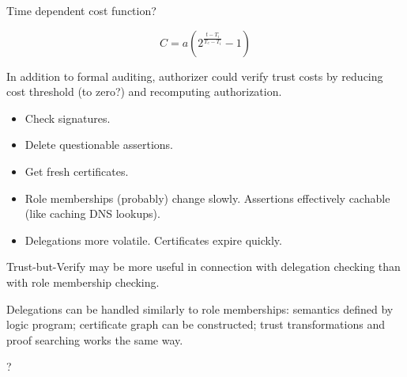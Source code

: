 \documentclass[landscape]{slides}
\begin{document}
Time dependent cost function?

\begin{displaymath}
C = a \left( 2^{\frac{t - T_i}{T_e - T_i}} - 1 \right)
\end{displaymath}
\stopslide

In addition to formal auditing, authorizer could verify trust costs by reducing cost threshold (to zero?) and recomputing authorization.
\begin{itemize}
\item Check signatures.
\item Delete questionable assertions.
\item Get fresh certificates.
\end{itemize}
\stopslide

\begin{itemize}
\item Role memberships (probably) change slowly. Assertions effectively cachable (like caching DNS lookups).
\item Delegations more volatile. Certificates expire quickly.
\end{itemize}
Trust-but-Verify may be more useful in connection with delegation checking than with role membership checking.

Delegations can be handled similarly to role memberships: semantics defined by logic program; certificate graph can be constructed; trust transformations and proof searching works the same way.
\stopslide

\begin{center}\Large ?\end{center}
\stopslide
\end{document}
